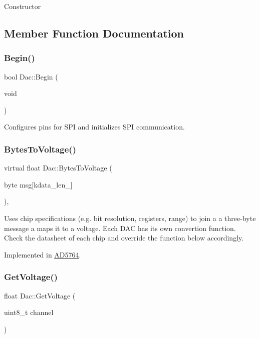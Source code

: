 Constructor 

\subsection{Member Function Documentation}
\mbox{\label{classDac_ad88e0048e59c0633b72769ddb8337e49}} 
\subsubsection{\texorpdfstring{Begin()}{Begin()}}
{\footnotesize\ttfamily bool Dac\+::\+Begin (\begin{DoxyParamCaption}\item[{void}]{ }\end{DoxyParamCaption})}

Configures pins for S\+PI and initializes S\+PI communication. \mbox{\label{classDac_a1dc9be97cb41ddacbd8dde0c5d4243b4}} 
\subsubsection{\texorpdfstring{Bytes\+To\+Voltage()}{BytesToVoltage()}}
{\footnotesize\ttfamily virtual float Dac\+::\+Bytes\+To\+Voltage (\begin{DoxyParamCaption}\item[{byte}]{msg\mbox{[}kdata\+\_\+len\+\_\+\mbox{]} }\end{DoxyParamCaption})\hspace{0.3cm}{\ttfamily [protected]}, {}}

Uses chip specifications (e.\+g. bit resolution, registers, range) to join a a three-\/byte message a maps it to a voltage. Each D\+AC has its own convertion function. Check the datasheet of each chip and override the function below accordingly. 

Implemented in \mbox{\hyperlink{classAD5764_a8f2845c7dd6b8984e7b85c35e50bbb66}{A\+D5764}}.

\mbox{\label{classDac_a55688546d527c42ebf48a12204e69731}} 
\subsubsection{\texorpdfstring{Get\+Voltage()}{GetVoltage()}}
{\footnotesize\ttfamily float Dac\+::\+Get\+Voltage (\begin{DoxyParamCaption}\item[{uint8\+\_\+t}]{channel }\end{DoxyParamCaption})}

